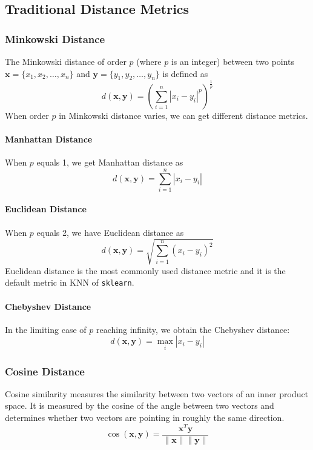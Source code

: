 

\subsection{Traditional Distance Metrics}


\label{simple}

\subsubsection{Minkowski Distance}
The Minkowski distance of order $p$ (where $p$ is an integer) between two points $\mathbf{x}=\{x_1,x_2,\dots,x_n\}$ and $\mathbf{y}=\{y_1,y_2,\dots,y_n\}$ is defined as
$$d(\mathbf{x},\mathbf{y})=\left( \sum_{i=1}^n |x_i-y_i|^p\right)^{\frac{1}{p}}$$
When order $p$ in Minkowski distance varies, we can get different distance metrics.

\paragraph{Manhattan Distance}
When $p$ equals 1, we get Manhattan distance as
$$d(\mathbf{x},\mathbf{y})=\sum_{i=1}^n |x_i-y_i|$$

\paragraph{Euclidean Distance}
When $p$ equals 2, we have Euclidean distance as
$$d(\mathbf{x},\mathbf{y})=\sqrt{\sum_{i=1}^n (x_i-y_i)^2}$$
Euclidean distance is the most commonly used distance metric and it is the default metric in KNN of \texttt{sklearn}.

\paragraph{Chebyshev Distance}
In the limiting case of $p$ reaching infinity, we obtain the Chebyshev distance:
$$d(\mathbf{x},\mathbf{y})=\max_i |x_i-y_i|$$

\subsubsection{Cosine Distance}
Cosine similarity measures the similarity between two vectors of an inner product space. It is measured by the cosine of the angle between two vectors and determines whether two vectors are pointing in roughly the same direction.
$$\cos(\mathbf{x},\mathbf{y})=\frac{\mathbf{x}^T\mathbf{y}}{\|\mathbf{x}\|\|\mathbf{y}\|}$$

